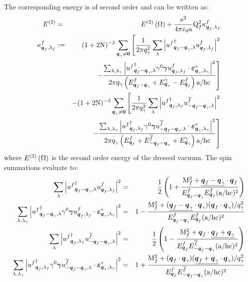 The corresponding energy is of second order and can be written as:
\begin{eqnarray*}
E^{(2)} & = & E^{(2)} \left( \Omega \right) + \frac{\mathrm e^2}{4 \pi \mathrm \varepsilon_0 \mathrm a} \mathrm Q_{f}^2 \kappa^f_{\boldsymbol{q}_f, \lambda_f} \\
\kappa^f_{\boldsymbol{q}_f, \lambda_f} & := & ( 1 + 2 \mathrm N )^{-3} \sum_{\boldsymbol{q}_\gamma \neq \boldsymbol{0}} \left[ \frac 1 {2 \pi q_\gamma^2} \sum_\lambda \left| {u^{f}}^{\dagger}_{{\boldsymbol{q}_f - \boldsymbol{q}_\gamma}, {\lambda}} u^{f}_{{\boldsymbol{q}_f}, {\lambda_f}} \right|^2 \right. \\
&& \left. - \frac {\sum_{\lambda,\lambda_\gamma} \left| {u^{f}}^{\dagger}_{{\boldsymbol{q}_f - \boldsymbol{q}_\gamma}, {\lambda}} \gamma^{0} \boldsymbol{\gamma} u^{f}_{{\boldsymbol{q}_f}, {\lambda_f}} \cdot \boldsymbol{\varepsilon}_{{\boldsymbol{q}_\gamma},{\lambda_\gamma}}^* \right|^2} {2 \pi q_\gamma \left( E^{f}_{\boldsymbol{q}_f - \boldsymbol{q}_\gamma} + E^{\gamma}_{\boldsymbol{q}_\gamma} - E^{f}_{\boldsymbol{q}_f} \right) \mathrm a / \mathrm h \mathrm c} \right] \\
&& - ( 1 + 2 \mathrm N )^{-3} \sum_{\boldsymbol{q}_\gamma \neq \boldsymbol{0}} \left[ \frac 1 {2 \pi q_\gamma^2} \sum_\lambda \left| {u^{f}}^{\dagger}_{{\boldsymbol{q}_f}, {\lambda_f}} u^{\overline{f}}_{{-\boldsymbol{q}_f - \boldsymbol{q}_\gamma}, {\lambda}} \right|^2 \right. \\
&& \left. - \frac {\sum_{\lambda,\lambda_\gamma} \left| {u^{f}}^{\dagger}_{{\boldsymbol{q}_f}, {\lambda_f}} \gamma^{0} \boldsymbol{\gamma} u^{\overline{f}}_{{-\boldsymbol{q}_f - \boldsymbol{q}_\gamma}, {\lambda}} \cdot \boldsymbol{\varepsilon}_{{\boldsymbol{q}_\gamma},{\lambda_\gamma}}^* \right|^2} {2 \pi q_\gamma \left( E^{f}_{\boldsymbol{q}_f} + E^{\overline{f}}_{-\boldsymbol{q}_f - \boldsymbol{q}_\gamma} + E^{\gamma}_{\boldsymbol{q}_\gamma} \right) \mathrm a / \mathrm h \mathrm c} \right]
\end{eqnarray*}
where $E^{(2)} \left( \Omega \right)$ is the second order energy of the dressed vacuum. The spin summations evaluate to:
\begin{eqnarray*}
\sum_{\lambda} \left| {u^{f}}^{\dagger}_{{\boldsymbol{q}_f - \boldsymbol{q}_\gamma}, {\lambda}} u^{f}_{{\boldsymbol{q}_f}, {\lambda_f}} \right|^2 & = & \frac 1 2 \left( 1 + \frac{\mathrm M_{f}^2 + \underline{\boldsymbol{q}_f - \boldsymbol{q}_\gamma} \cdot \boldsymbol{q}_f}{E^{f}_{\boldsymbol{q}_f - \boldsymbol{q}_\gamma} E^{f}_{\boldsymbol{q}_f} ( \mathrm a / \mathrm h \mathrm c )^2} \right) \\
\sum_{\lambda,\lambda_\gamma} \left| {u^{f}}^{\dagger}_{{\boldsymbol{q}_f - \boldsymbol{q}_\gamma}, {\lambda}} \gamma^{0} \boldsymbol{\gamma} u^{f}_{{\boldsymbol{q}_f}, {\lambda_f}} \cdot \boldsymbol{\varepsilon}_{{\boldsymbol{q}_\gamma},{\lambda_\gamma}}^* \right|^2 & = & 1 - \frac{\mathrm M_{f}^2 + ( \underline{\boldsymbol{q}_f - \boldsymbol{q}_\gamma} \cdot \boldsymbol{q}_\gamma ) ( \boldsymbol{q}_f \cdot \boldsymbol{q}_\gamma ) / q_\gamma^2}{E^{f}_{\boldsymbol{q}_f - \boldsymbol{q}_\gamma} E^{f}_{\boldsymbol{q}_f} ( \mathrm a / \mathrm h \mathrm c )^2} \\
\sum_{\lambda} \left| {u^{f}}^{\dagger}_{{\boldsymbol{q}_f}, {\lambda_f}} u^{\overline{f}}_{{-\boldsymbol{q}_f - \boldsymbol{q}_\gamma}, {\lambda}} \right|^2 & = & \frac 1 2 \left( 1 - \frac{\mathrm M_{f}^2 + \boldsymbol{q}_f \cdot \underline{\boldsymbol{q}_f + \boldsymbol{q}_\gamma}}{E^{f}_{\boldsymbol{q}_f} E^{\overline{f}}_{-\boldsymbol{q}_f - \boldsymbol{q}_\gamma} ( \mathrm a / \mathrm h \mathrm c )^2} \right) \\
\sum_{\lambda,\lambda_\gamma} \left| {u^{f}}^{\dagger}_{{\boldsymbol{q}_f}, {\lambda_f}} \gamma^{0} \boldsymbol{\gamma} u^{\overline{f}}_{{-\boldsymbol{q}_f - \boldsymbol{q}_\gamma}, {\lambda}} \cdot \boldsymbol{\varepsilon}_{{\boldsymbol{q}_\gamma},{\lambda_\gamma}}^* \right|^2 & = & 1 + \frac{\mathrm M_{f}^2 + ( \boldsymbol{q}_f \cdot \boldsymbol{q}_\gamma ) ( \underline{\boldsymbol{q}_f + \boldsymbol{q}_\gamma} \cdot \boldsymbol{q}_\gamma ) / q_\gamma^2}{E^{f}_{\boldsymbol{q}_f} E^{\overline{f}}_{- \boldsymbol{q}_f - \boldsymbol{q}_\gamma} ( \mathrm a / \mathrm h \mathrm c )^2}
\end{eqnarray*}
